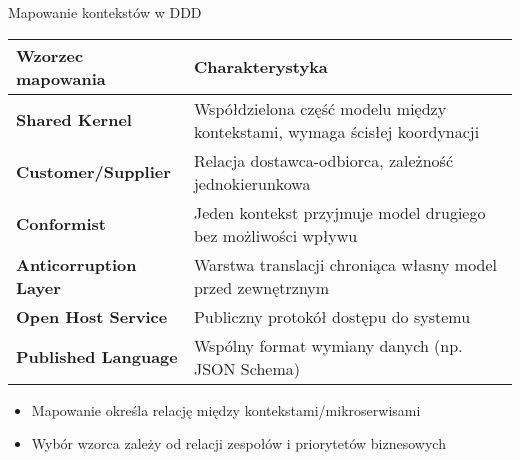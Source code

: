 \documentclass[aspectratio=169,xcolor=table]{beamer}
\begin{document}
\begin{frame}{Mapowanie kontekstów w DDD}
  \begin{table}
    \footnotesize
    \begin{tabular}{>{\raggedright\arraybackslash}p{3cm}|>{\raggedright\arraybackslash}p{7cm}}
      \toprule
      \textbf{Wzorzec mapowania} & \textbf{Charakterystyka} \\
      \midrule
      \textbf{Shared Kernel} & Współdzielona część modelu między kontekstami, wymaga ścisłej koordynacji \\
      \midrule
      \textbf{Customer/Supplier} & Relacja dostawca-odbiorca, zależność jednokierunkowa \\
      \midrule
      \textbf{Conformist} & Jeden kontekst przyjmuje model drugiego bez możliwości wpływu \\
      \midrule
      \textbf{Anticorruption Layer} & Warstwa translacji chroniąca własny model przed zewnętrznym \\
      \midrule
      \textbf{Open Host Service} & Publiczny protokół dostępu do systemu \\
      \midrule
      \textbf{Published Language} & Wspólny format wymiany danych (np. JSON Schema) \\
      \bottomrule
    \end{tabular}
  \end{table}
  
  \begin{itemize}
    \item Mapowanie określa relację między kontekstami/mikroserwisami
    \item Wybór wzorca zależy od relacji zespołów i priorytetów biznesowych
  \end{itemize}
\end{frame}
\end{document}
